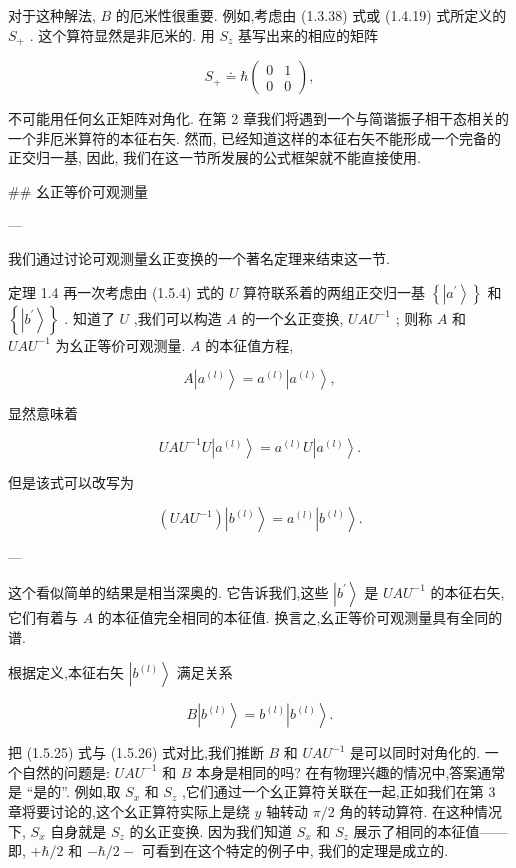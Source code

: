 \documentclass[lang=cn,newtx,10pt,scheme=chinese,thmcnt=section]{elegantbook}
\begin{document}
对于这种解法, $B$ 的厄米性很重要. 例如,考虑由 (1.3.38) 式或 (1.4.19) 式所定义的 ${S}_{ + }$ . 这个算符显然是非厄米的. 用 ${S}_{z}$ 基写出来的相应的矩阵

$$
{S}_{ + } \doteq \hbar \left( \begin{array}{ll} 0 & 1 \\ 0 & 0 \end{array}\right) , \tag{1.5.22}
$$

不可能用任何幺正矩阵对角化. 在第 2 章我们将遇到一个与简谐振子相干态相关的一个非厄米算符的本征右矢. 然而, 已经知道这样的本征右矢不能形成一个完备的正交归一基, 因此, 我们在这一节所发展的公式框架就不能直接使用.

## 幺正等价可观测量

---

我们通过讨论可观测量幺正变换的一个著名定理来结束这一节.

定理 1.4 再一次考虑由 (1.5.4) 式的 $U$ 算符联系着的两组正交归一基 $\left\{ \left| {a}^{\prime }\right\rangle \right\}$ 和 $\left\{ \left| {b}^{\prime }\right\rangle \right\}$ . 知道了 $U$ ,我们可以构造 $A$ 的一个幺正变换, ${UA}{U}^{-1}$ ; 则称 $A$ 和 ${UA}{U}^{-1}$ 为幺正等价可观测量. $A$ 的本征值方程,

$$
A\left| {a}^{\left( l\right) }\right\rangle = {a}^{\left( l\right) }\left| {a}^{\left( l\right) }\right\rangle , \tag{1.5.23}
$$

显然意味着

$$
{UA}{U}^{-1}U\left| {a}^{\left( l\right) }\right\rangle = {a}^{\left( l\right) }U\left| {a}^{\left( l\right) }\right\rangle . \tag{1.5.24}
$$

但是该式可以改写为

$$
\left( {{UA}{U}^{-1}}\right) \left| {b}^{\left( l\right) }\right\rangle = {a}^{\left( l\right) }\left| {b}^{\left( l\right) }\right\rangle . \tag{1.5.25}
$$

---

这个看似简单的结果是相当深奥的. 它告诉我们,这些 $\left| {b}^{\prime }\right\rangle$ 是 ${UA}{U}^{-1}$ 的本征右矢, 它们有着与 $A$ 的本征值完全相同的本征值. 换言之,幺正等价可观测量具有全同的谱.

根据定义,本征右矢 $\left| {b}^{\left( l\right) }\right\rangle$ 满足关系

$$
B\left| {b}^{\left( l\right) }\right\rangle = {b}^{\left( l\right) }\left| {b}^{\left( l\right) }\right\rangle . \tag{1.5.26}
$$

把 (1.5.25) 式与 (1.5.26) 式对比,我们推断 $B$ 和 ${UA}{U}^{-1}$ 是可以同时对角化的. 一个自然的问题是: ${UA}{U}^{-1}$ 和 $B$ 本身是相同的吗? 在有物理兴趣的情况中,答案通常是 “是的”. 例如,取 ${S}_{x}$ 和 ${S}_{z}$ ,它们通过一个幺正算符关联在一起,正如我们在第 3 章将要讨论的,这个幺正算符实际上是绕 $y$ 轴转动 $\pi /2$ 角的转动算符. 在这种情况下, ${S}_{x}$ 自身就是 ${S}_{z}$ 的幺正变换. 因为我们知道 ${S}_{x}$ 和 ${S}_{z}$ 展示了相同的本征值——即, $+ \hbar /2$ 和 $- \hbar /2 -$ 可看到在这个特定的例子中, 我们的定理是成立的.
\end{document}

